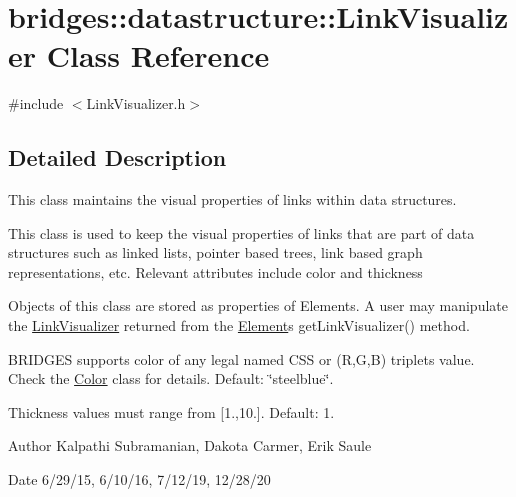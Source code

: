 \hypertarget{classbridges_1_1datastructure_1_1_link_visualizer}{}\section{bridges\+:\+:datastructure\+:\+:Link\+Visualizer Class Reference}
\label{classbridges_1_1datastructure_1_1_link_visualizer}


{\ttfamily \#include $<$Link\+Visualizer.\+h$>$}



\subsection{Detailed Description}
This class maintains the visual properties of links within data structures. 

This class is used to keep the visual properties of links that are part of data structures such as linked lists, pointer based trees, link based graph representations, etc. Relevant attributes include color and thickness

Objects of this class are stored as properties of Elements. A user may manipulate the \hyperlink{classbridges_1_1datastructure_1_1_link_visualizer}{Link\+Visualizer} returned from the \hyperlink{classbridges_1_1datastructure_1_1_element}{Element}\textquotesingle{}s get\+Link\+Visualizer() method.

B\+R\+I\+D\+G\+ES supports color of any legal named C\+SS or (R,G,B) triplets value. Check the \hyperlink{classbridges_1_1datastructure_1_1_color}{Color} class for details. Default\+: \char`\"{}steelblue\char`\"{}.

Thickness values must range from \mbox{[}1.,10.\mbox{]}. Default\+: 1.

\begin{DoxyAuthor}{Author}
Kalpathi Subramanian, Dakota Carmer, Erik Saule 
\end{DoxyAuthor}
\begin{DoxyDate}{Date}
6/29/15, 6/10/16, 7/12/19, 12/28/20 
\end{DoxyDate}
